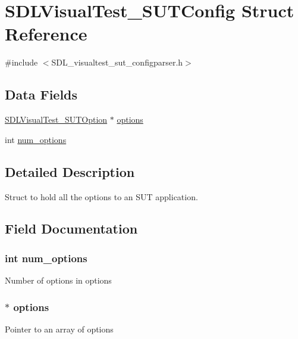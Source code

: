 \hypertarget{struct_s_d_l_visual_test___s_u_t_config}{\section{S\-D\-L\-Visual\-Test\-\_\-\-S\-U\-T\-Config Struct Reference}
\label{struct_s_d_l_visual_test___s_u_t_config}
}


{\ttfamily \#include $<$S\-D\-L\-\_\-visualtest\-\_\-sut\-\_\-configparser.\-h$>$}

\subsection*{Data Fields}
\begin{DoxyCompactItemize}
\item 
\hyperlink{struct_s_d_l_visual_test___s_u_t_option}{S\-D\-L\-Visual\-Test\-\_\-\-S\-U\-T\-Option} $\ast$ \hyperlink{struct_s_d_l_visual_test___s_u_t_config_afda1bef370f3d5ea6919b7b6a73d01c0}{options}
\item 
int \hyperlink{struct_s_d_l_visual_test___s_u_t_config_a593108c2cc4b7dd3edecefd724edfd51}{num\-\_\-options}
\end{DoxyCompactItemize}


\subsection{Detailed Description}
Struct to hold all the options to an S\-U\-T application. 

\subsection{Field Documentation}
\hypertarget{struct_s_d_l_visual_test___s_u_t_config_a593108c2cc4b7dd3edecefd724edfd51}{
\subsubsection[{num\-\_\-options}]{\setlength{\rightskip}{0pt plus 5cm}int num\-\_\-options}}\label{struct_s_d_l_visual_test___s_u_t_config_a593108c2cc4b7dd3edecefd724edfd51}
Number of options in {\ttfamily options} \hypertarget{struct_s_d_l_visual_test___s_u_t_config_afda1bef370f3d5ea6919b7b6a73d01c0}{
\subsubsection[{options}]{$\ast$ options}}\label{struct_s_d_l_visual_test___s_u_t_config_afda1bef370f3d5ea6919b7b6a73d01c0}
Pointer to an array of options 

